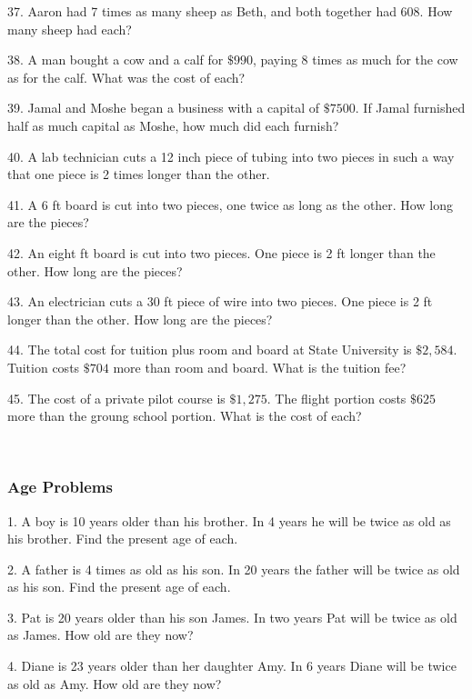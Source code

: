 37. Aaron had 7 times as many sheep as Beth, and both together had 608. How many sheep had each?

\pagebreak

38. A man bought a cow and a calf for $\$990$, paying 8 times as much
for the cow as for the calf. What was the cost of each?

39. Jamal and Moshe began a business with a capital of $\$7500$. If
Jamal furnished half as much capital as
Moshe, how much did each furnish?

40. A lab technician cuts a 12 inch piece of tubing into two pieces in such a
way that one piece is 2 times longer than the other.

41. A 6 ft board is cut into two pieces, one twice as long as the other. How
long are the pieces?

42. An eight ft board is cut into two pieces. One piece is 2 ft longer than
the other. How long are the pieces?

43. An electrician cuts a 30 ft piece of wire into two pieces. One piece is 2
ft longer than the other. How long are the pieces?

44. The total cost for tuition plus room and board at State University is
$\$2,584$. Tuition costs $\$704$ more than
room and board. What is the tuition fee?

45. The cost of a private pilot course is $\$1,275$. The flight
portion costs $\$625$ more than the groung
school portion. What is the cost of each?

\vspace{4in}
~

\pagebreak

	\subsubsection{Age Problems}\par

1. A boy is 10 years older than his brother. In 4 years he will be twice as
old as his brother. Find the present age of each.

2. A father is 4 times as old as his son. In 20 years the father will be
twice as old as his son. Find the present age of each.

3. Pat is 20 years older than his son James. In two years Pat will be twice as
old as James. How old are they now?

4. Diane is 23 years older than her daughter Amy. In 6 years Diane will be
twice as old as Amy. How old are they now?

